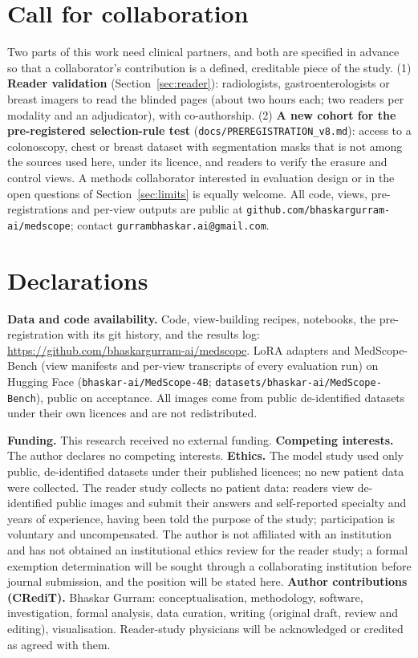 \documentclass[11pt]{article}
\begin{document}
\section*{Call for collaboration}\label{sec:collab}
Two parts of this work need clinical partners, and both are specified in advance so that a collaborator's contribution is a defined, creditable piece of the study. (1) \textbf{Reader validation} (Section~\ref{sec:reader}): radiologists, gastroenterologists or breast imagers to read the blinded pages (about two hours each; two readers per modality and an adjudicator), with co-authorship. (2) \textbf{A new cohort for the pre-registered selection-rule test} (\texttt{docs/PREREGISTRATION\_v8.md}): access to a colonoscopy, chest or breast dataset with segmentation masks that is not among the sources used here, under its licence, and readers to verify the erasure and control views. A methods collaborator interested in evaluation design or in the open questions of Section~\ref{sec:limits} is equally welcome. All code, views, pre-registrations and per-view outputs are public at \texttt{github.com/bhaskargurram-ai/medscope}; contact \texttt{gurrambhaskar.ai@gmail.com}.

\section*{Declarations}
\textbf{Data and code availability.} Code, view-building recipes, notebooks, the pre-registration with its git history, and the results log: \url{https://github.com/bhaskargurram-ai/medscope}. LoRA adapters and MedScope-Bench (view manifests and per-view transcripts of every evaluation run) on Hugging Face (\texttt{bhaskar-ai/MedScope-4B}; \texttt{datasets/bhaskar-ai/MedScope-Bench}), public on acceptance. All images come from public de-identified datasets under their own licences and are not redistributed.

\textbf{Funding.} This research received no external funding.
\textbf{Competing interests.} The author declares no competing interests.
\textbf{Ethics.} The model study used only public, de-identified datasets under their published licences; no new patient data were collected. The reader study collects no patient data: readers view de-identified public images and submit their answers and self-reported specialty and years of experience, having been told the purpose of the study; participation is voluntary and uncompensated. The author is not affiliated with an institution and has not obtained an institutional ethics review for the reader study; a formal exemption determination will be sought through a collaborating institution before journal submission, and the position will be stated here.
\textbf{Author contributions (CRediT).} Bhaskar Gurram: conceptualisation, methodology, software, investigation, formal analysis, data curation, writing (original draft, review and editing), visualisation. Reader-study physicians will be acknowledged or credited as agreed with them.
\end{document}
